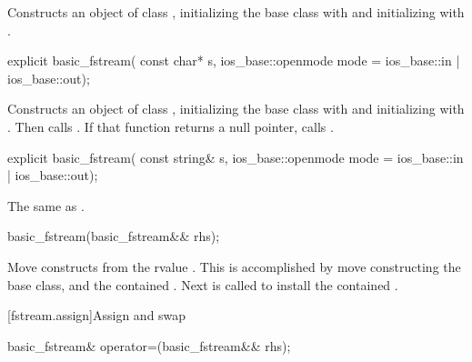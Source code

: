 \begin{itemdescr}
\pnum
\effects
Constructs an object of class
,
initializing the base class with
and initializing
with
.
\end{itemdescr}

%
\begin{itemdecl}
explicit basic_fstream(
  const char* s,
  ios_base::openmode mode = ios_base::in | ios_base::out);
\end{itemdecl}

\begin{itemdescr}
\pnum
\effects
Constructs an object of class
,
initializing the base class with
and initializing
with
.
Then calls
.
If that function returns a null pointer, calls
.
\end{itemdescr}

%
\begin{itemdecl}
explicit basic_fstream(
  const string& s,
  ios_base::openmode mode = ios_base::in | ios_base::out);
\end{itemdecl}

\begin{itemdescr}
\pnum
\effects The same as .
\end{itemdescr}

%
\begin{itemdecl}
basic_fstream(basic_fstream&& rhs);
\end{itemdecl}

\begin{itemdescr}
\pnum
\effects Move constructs from the rvalue . This
is accomplished by move constructing the base class, and the contained
. Next
 is called to install
the contained .
\end{itemdescr}

[fstream.assign]{Assign and swap}

%
%
\begin{itemdecl}
basic_fstream& operator=(basic_fstream&& rhs);
\end{itemdecl}

